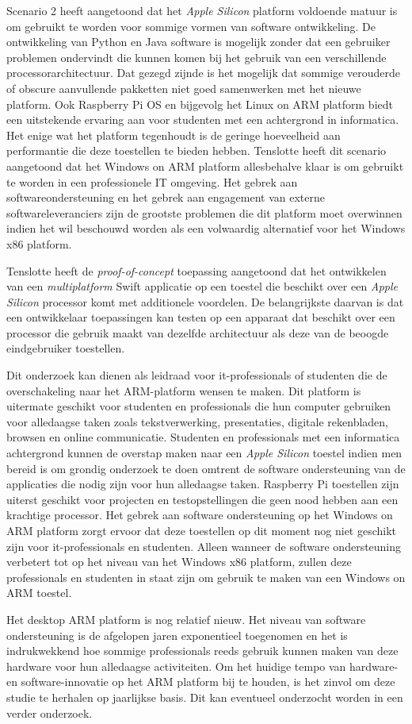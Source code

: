 Scenario 2 heeft aangetoond dat het \textit{Apple Silicon} platform voldoende matuur is om gebruikt te worden voor sommige vormen van software ontwikkeling. De ontwikkeling van Python en Java software is mogelijk zonder dat een gebruiker problemen ondervindt die kunnen komen bij het gebruik van een verschillende processorarchitectuur. Dat gezegd zijnde is het mogelijk dat sommige verouderde of obscure aanvullende pakketten niet goed samenwerken met het nieuwe platform. Ook Raspberry Pi OS en bijgevolg het Linux on ARM platform biedt een uitstekende ervaring aan voor studenten met een achtergrond in informatica. Het enige wat het platform tegenhoudt is de geringe hoeveelheid aan performantie die deze toestellen te bieden hebben. Tenslotte heeft dit scenario aangetoond dat het Windows on ARM platform allesbehalve klaar is om gebruikt te worden in een professionele IT omgeving. Het gebrek aan softwareondersteuning en het gebrek aan engagement van externe softwareleveranciers zijn de grootste problemen die dit platform moet overwinnen indien het wil beschouwd worden als een volwaardig alternatief voor het Windows x86 platform.

Tenslotte heeft de \textit{proof-of-concept} toepassing aangetoond dat het ontwikkelen van een \textit{multiplatform} Swift applicatie op een toestel die beschikt over een \textit{Apple Silicon} processor komt met additionele voordelen. De belangrijkste daarvan is dat een ontwikkelaar toepassingen kan testen op een apparaat dat beschikt over een processor die gebruik maakt van dezelfde architectuur als deze van de beoogde eindgebruiker toestellen.

Dit onderzoek kan dienen als leidraad voor it-professionals of studenten die de overschakeling naar het ARM-platform wensen te maken. Dit platform is uitermate geschikt voor studenten en professionals die hun computer gebruiken voor alledaagse taken zoals tekstverwerking, presentaties, digitale rekenbladen, browsen en online communicatie. Studenten en professionals met een informatica achtergrond kunnen de overstap maken naar een \textit{Apple Silicon} toestel indien men bereid is om grondig onderzoek te doen omtrent de software ondersteuning van de applicaties die nodig zijn voor hun alledaagse taken. Raspberry Pi toestellen zijn uiterst geschikt voor projecten en testopstellingen die geen nood hebben aan een krachtige processor. Het gebrek aan software ondersteuning op het Windows on ARM platform zorgt ervoor dat deze toestellen op dit moment nog niet geschikt zijn voor it-professionals en studenten. Alleen wanneer de software ondersteuning verbetert tot op het niveau van het Windows x86 platform, zullen deze professionals en studenten in staat zijn om gebruik te maken van een Windows on ARM toestel. 

Het desktop ARM platform is nog relatief nieuw. Het niveau van software ondersteuning is de afgelopen jaren exponentieel toegenomen en het is indrukwekkend hoe sommige professionals reeds gebruik kunnen maken van deze hardware voor hun alledaagse activiteiten. Om het huidige tempo van hardware- en software-innovatie op het ARM platform bij te houden, is het zinvol om deze studie te herhalen op jaarlijkse basis. Dit kan eventueel onderzocht worden in een verder onderzoek.
